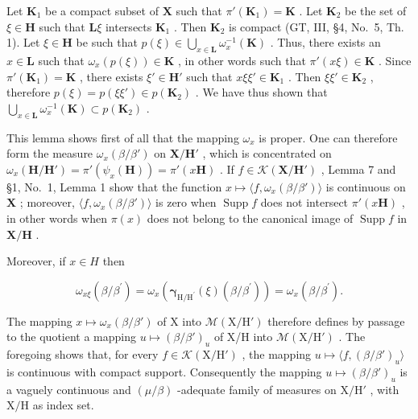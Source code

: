 Let \(\mathbf{K}_1\) be a compact subset of \(\mathbf{X}\) such that \(\pi'(\mathbf{K}_1) = \mathbf{K}\) . Let \(\mathbf{K}_2\) be the set of \(\xi \in \mathbf{H}\) such that \(\mathbf{L}\xi\) intersects \(\mathbf{K}_1\) . Then \(\mathbf{K}_2\) is compact (GT, III, §4, No.~5, Th. 1). Let \(\xi \in \mathbf{H}\) be such that \(p(\xi) \in \bigcup_{x \in \mathbf{L}} \omega_x^{-1}(\mathbf{K})\) . Thus, there exists an \(x \in \mathbf{L}\) such that \(\omega_x(p(\xi)) \in \mathbf{K}\) , in other words such that \(\pi'(x\xi) \in \mathbf{K}\) . Since \(\pi'(\mathbf{K}_1) = \mathbf{K}\) , there exists \(\xi' \in \mathbf{H}'\) such that \(x\xi\xi' \in \mathbf{K}_1\) . Then \(\xi\xi' \in \mathbf{K}_2\) , therefore \(p(\xi) = p(\xi\xi') \in p(\mathbf{K}_2)\) . We have thus shown that \(\bigcup_{x \in \mathbf{L}} \omega_x^{-1}(\mathbf{K}) \subset p(\mathbf{K}_2)\) .

This lemma shows first of all that the mapping \(\omega_x\) is proper. One can therefore form the measure \(\omega_x(\beta/\beta')\) on \(\mathbf{X}/\mathbf{H}'\) , which is concentrated on \(\omega_x(\mathbf{H}/\mathbf{H}') = \pi'(\psi_x(\mathbf{H})) = \pi'(x\mathbf{H})\) . If \(f \in \mathcal{K}(\mathbf{X}/\mathbf{H}')\) , Lemma 7 and §1, No.~1, Lemma 1 show that the function \(x \mapsto \langle f, \omega_x(\beta/\beta') \rangle\) is continuous on \(\mathbf{X}\) ; moreover, \(\langle f, \omega_x(\beta/\beta') \rangle\) is zero when \(\operatorname{Supp} f\) does not intersect \(\pi'(x\mathbf{H})\) , in other words when \(\pi(x)\) does not belong to the canonical image of \(\operatorname{Supp} f\) in \(\mathbf{X}/\mathbf{H}\) .

Moreover, if \(x \in H\) then

\[
\omega_ {x \xi} (\beta / \beta^ {\prime}) = \omega_ {x} \left(\boldsymbol {\gamma} _ {\mathrm{H} / \mathrm{H} ^ {\prime}} (\xi) (\beta / \beta^ {\prime})\right) = \omega_ {x} (\beta / \beta^ {\prime}).
\]

The mapping \(x \mapsto \omega_x(\beta/\beta')\) of X into \(\mathcal{M}(\mathrm{X}/\mathrm{H}')\) therefore defines by passage to the quotient a mapping \(u \mapsto (\beta/\beta')_u\) of X/H into \(\mathcal{M}(\mathrm{X}/\mathrm{H}')\) . The foregoing shows that, for every \(f \in \mathcal{K}(\mathrm{X}/\mathrm{H}')\) , the mapping \(u \mapsto \langle f, (\beta/\beta')_u \rangle\) is continuous with compact support. Consequently the mapping \(u \mapsto (\beta/\beta')_u\) is a vaguely continuous and \((\mu/\beta)\) -adequate family of measures on \(\mathrm{X}/\mathrm{H}'\) , with \(\mathrm{X}/\mathrm{H}\) as index set.

